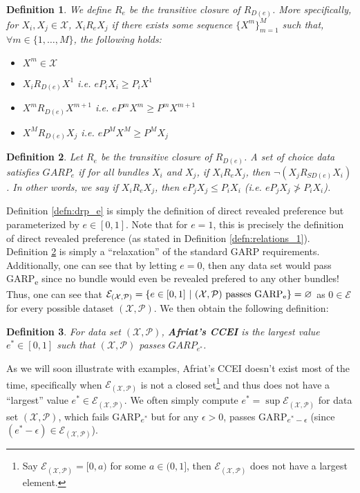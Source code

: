 \documentclass{article} %
\theoremstyle{style1}
\newtheorem{definition}{Definition} %
\theoremstyle{example}
\begin{document}
\begin{definition}\label{defn:rp_e}\leavevmode
We define $R_e$ be the transitive closure of $R_{D(e)}$. More specifically, for $X_i,X_j\in\mathcal{X}$, $X_iR_eX_j$ if there exists some sequence $\{X^m\}_{m=1}^M$ such that, $\forall m\in\{1,\ldots,M\}$, the following holds:
\begin{itemize}[topsep=0pt]
  \item $X^m\in\mathcal{X}$
  \item $X_i R_{D(e)} X^1$ i.e. $eP_iX_i\geq P_i X^1$
  \item $X^m R_{D(e)} X^{m+1}$ i.e. $e P^m X^m \geq P^m X^{m+1}$
  \item $X^M R_{D(e)}X_j$ i.e. $e P^M X^M\geq P^M X_j$
\end{itemize}  
\end{definition}

\begin{definition}\label{defn:GARPe}
Let $R_e$ be the transitive closure of $R_{D(e)}$. A set of choice data satisfies $GARP_e$ if for all bundles $X_i$ and $X_j$, if $X_i R_e X_j$, then $\neg (X_j R_{SD(e)} X_i)$. In other words, we say if $X_i R_e X_j$, then $eP_jX_j \leq P_iX_i$ (i.e. $eP_jX_j \not> P_iX_i$).
\end{definition}
Definition \ref{defn:drp_e} is simply the definition of direct revealed preference but parameterized by $e\in[0,1]$. Note that for $e=1$, this is precisely the definition of direct revealed preference (as stated in Definition \ref{defn:relations_1}). Definition \ref{defn:GARPe} is simply a ``relaxation'' of the standard GARP requirements. Additionally, one can see that by letting $e=0$, then any data set would pass GARP\textsubscript{e} since no bundle would even be revealed prefered to any other bundles! Thus, one can see that $\mathcal{E}_{(\mathcal{X},\mathcal{P})}=\{e\in[0,1]\ |\ (\mathcal{X},\mathcal{P})\textrm{ passes GARP\textsubscript{e}}\}=\varnothing$ as $0\in\mathcal{E}$ for every possible dataset $(\mathcal{X},\mathcal{P})$. We then obtain the following definition:

\begin{definition}\label{defn:Afriat_CCEI}
For data set $(\mathcal{X},\mathcal{P})$, \textbf{Afriat's CCEI} is the \emph{largest} value $e^*\in[0,1]$ such that $(\mathcal{X},\mathcal{P})$ passes $GARP_{e^*}$.
\end{definition}
As we will soon illustrate with examples, Afriat's CCEI doesn't exist most of the time, specifically when $\mathcal{E}_{(\mathcal{X},\mathcal{P})}$ is not a closed set\footnote{Say $\mathcal{E}_{(\mathcal{X},\mathcal{P})}=[0,a)$ for some $a\in(0,1]$, then $\mathcal{E}_{(\mathcal{X},\mathcal{P})}$ does not have a largest element.} and thus does not have a ``largest'' value $e^*\in\mathcal{E}_{(\mathcal{X},\mathcal{P})}$. We often simply compute $e^*=\sup \mathcal{E}_{(\mathcal{X},\mathcal{P})}$ for data set $(\mathcal{X},\mathcal{P})$, which fails GARP\textsubscript{$e^*$} but for any $\epsilon>0$, passes GARP\textsubscript{$e^*-\epsilon$} (since $(e^*-\epsilon)\in \mathcal{E}_{(\mathcal{X},\mathcal{P})}$).
\end{document}

